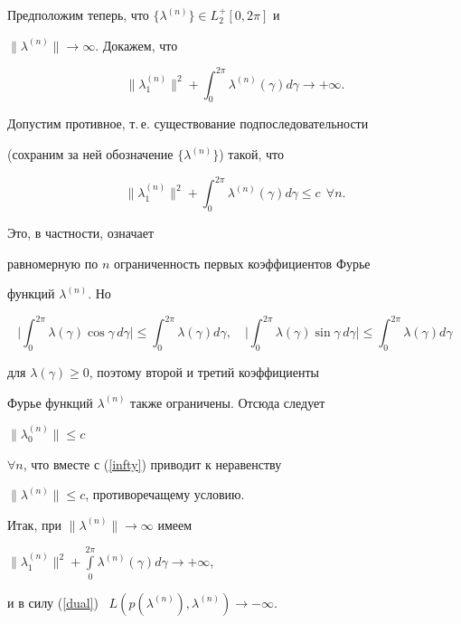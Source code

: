 \begin{pf}
Предположим теперь, что $\{\lambda^{(n)}\} \in L_{2}^{+}[0,2\pi]$ и


$\|\lambda^{(n)}\|\to\infty$. Докажем, что


$$


\|\lambda^{(n)}_{1}\|^{2}+


\int_{0}^{2\pi}\lambda^{(n)}(\gamma)d\gamma\to +\infty.


$$


Допустим противное, т.\,е. существование подпоследовательности


(сохраним за ней обозначение $\{ \lambda^{(n)}\} $) такой, что


\begin{equation}\label {infty}


\|\lambda^{(n)}_{1}\|^{2}+\int_{0}^{2\pi}\lambda^{(n)}(\gamma)d\gamma\leq


c \ \ \forall n.


\end{equation}


Это, в частности, означает


равномерную по $n$ ограниченность первых коэффициентов Фурье


функций $\lambda^{(n)}$. Но


$$


\bigg|\int_{0}^{2\pi}\lambda(\gamma)\cos \gamma\, d\gamma


\bigg|\leq \int_{0}^{2\pi}\lambda(\gamma) d\gamma, \quad


\bigg|\int_{0}^{2\pi}\lambda(\gamma)\sin \gamma\, d\gamma


\bigg|\leq \int_{0}^{2\pi}\lambda(\gamma) d\gamma


$$


для $\lambda(\gamma)\geq 0$, поэтому второй и третий коэффициенты


Фурье функций $\lambda^{(n)}$ также ограничены. Отсюда следует


$\|\lambda^{(n)}_0\|\leq c$


$\forall n$, что вместе с (\ref{infty}) приводит к неравенству


$\|\lambda^{(n)}\|\leq c$, противоречащему условию.


Итак, при $\|\lambda^{(n)}\|\to\infty$ имеем


$\|\lambda^{(n)}_1\|^{2}+\int\limits_{0}^{2\pi}\lambda^{(n)}(\gamma)d\gamma


\to +\infty$,


и в силу (\ref{dual}) \ $L(p(\lambda^{(n)}),\lambda^{(n)})\to-\infty$.


\end{pf}






